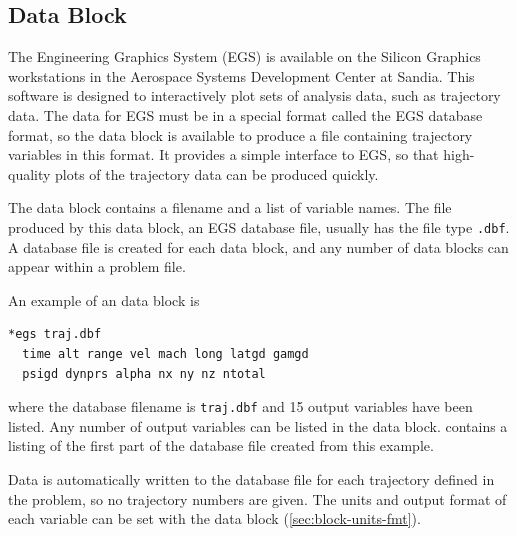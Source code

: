 \subsection{ Data Block}\label{sec:block-egs}

The Engineering Graphics System (EGS) is available on the Silicon Graphics
workstations in the Aerospace Systems Development Center at Sandia.
This software is designed to interactively plot sets of analysis data, such as
trajectory data. The data for EGS must be in a special format called the EGS database
format, so the  data block is available to produce a file
containing trajectory variables in this format. It provides a simple interface to EGS,
so that high-quality plots of the trajectory data can be produced quickly.

The  data block contains a filename and a list of variable names.
The file produced by this data block, an EGS database file, usually has the file type
\texttt{.dbf}. A database file is created for each  data block,
and any number of  data blocks can appear within a problem
file.

An example of an  data block is

\begin{lstlisting}[style=taosmanual]
*egs traj.dbf
  time alt range vel mach long latgd gamgd
  psigd dynprs alpha nx ny nz ntotal
\end{lstlisting}

where the database filename is \texttt{traj.dbf} and 15 output variables have been
listed. Any number of output variables can be listed in the data block.
 contains a listing of the first part of the database
file created from this example.

\begin{center}
  \begin{minipage}{0.96\linewidth}
    
    \label{fig:egs-database-example}
  \end{minipage}
\end{center}

Data is automatically written to the database file for each trajectory defined in the
problem, so no trajectory numbers are given. The units and output format of each
variable can be set with the  data block
(\cref{sec:block-units-fmt}).

